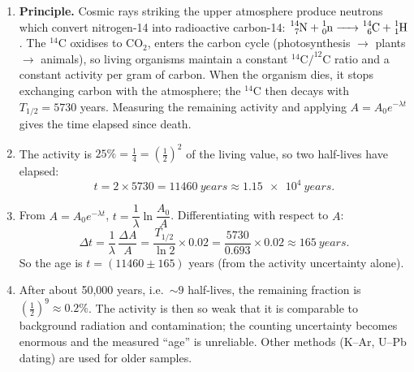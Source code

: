 \documentclass[11pt]{article}
\begin{document}
\begin{corrige}
\begin{enumerate}
    \item \textbf{Principle.} Cosmic rays striking the upper atmosphere produce neutrons which convert nitrogen-14 into radioactive carbon-14: $\ce{^{14}_{7}N + ^{1}_{0}n -> ^{14}_{6}C + ^{1}_{1}H}$. The $^{14}\mathrm{C}$ oxidises to $\mathrm{CO}_2$, enters the carbon cycle (photosynthesis $\to$ plants $\to$ animals), so living organisms maintain a constant $^{14}\mathrm{C}/^{12}\mathrm{C}$ ratio and a constant activity per gram of carbon. When the organism dies, it stops exchanging carbon with the atmosphere; the $^{14}\mathrm{C}$ then decays with $T_{1/2} = 5730$ years. Measuring the remaining activity and applying $A = A_0 e^{-\lambda t}$ gives the time elapsed since death.
    \item The activity is $25\% = \frac{1}{4} = \left(\frac{1}{2}\right)^{2}$ of the living value, so two half-lives have elapsed:
    \[t = 2 \times 5730 = \SI{11460}{years} \approx \SI{1.15e4}{years}.\]
    \item From $A = A_0 e^{-\lambda t}$, $t = \dfrac{1}{\lambda}\ln\dfrac{A_0}{A}$. Differentiating with respect to $A$:
    \[\Delta t = \frac{1}{\lambda}\,\frac{\Delta A}{A} = \frac{T_{1/2}}{\ln 2}\times 0.02 = \frac{5730}{0.693}\times 0.02 \approx \SI{165}{years}.\]
    So the age is $t = (11460 \pm 165)$ years (from the activity uncertainty alone).
    \item After about 50,000 years, i.e.\ $\sim 9$ half-lives, the remaining fraction is $\left(\frac12\right)^{9} \approx 0.2\%$. The activity is then so weak that it is comparable to background radiation and contamination; the counting uncertainty becomes enormous and the measured ``age'' is unreliable. Other methods (K--Ar, U--Pb dating) are used for older samples.
\end{enumerate}
\end{corrige}
\end{document}
